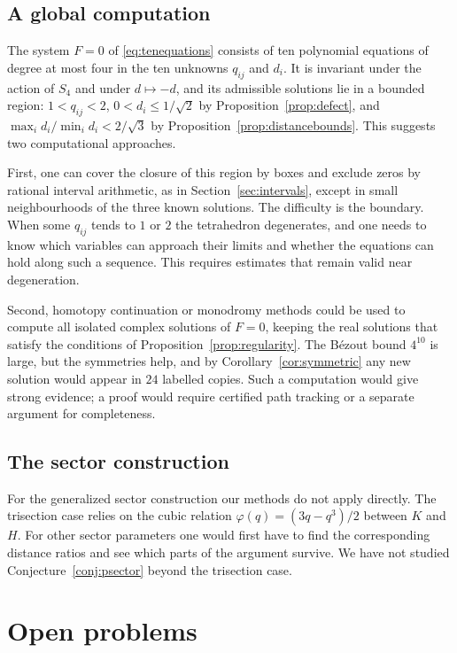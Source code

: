 \documentclass[11pt]{article}
\theoremstyle{definition}
\theoremstyle{remark}
\newcommand{\ph}{\varphi}
\begin{document}
\subsection{A global computation}

The system $F=0$ of \eqref{eq:tenequations} consists of ten polynomial equations of degree at most four in the ten unknowns $q_{ij}$ and $d_i$. It is invariant under the action of $S_4$ and under $d\mapsto-d$, and its admissible solutions lie in a bounded region: $1<q_{ij}<2$, $0<d_i\le1/\sqrt2$ by Proposition~\ref{prop:defect}, and $\max_id_i/\min_id_i<2/\sqrt3$ by Proposition~\ref{prop:distancebounds}. This suggests two computational approaches.

First, one can cover the closure of this region by boxes and exclude zeros by rational interval arithmetic, as in Section~\ref{sec:intervals}, except in small neighbourhoods of the three known solutions. The difficulty is the boundary. When some $q_{ij}$ tends to $1$ or $2$ the tetrahedron degenerates, and one needs to know which variables can approach their limits and whether the equations can hold along such a sequence. This requires estimates that remain valid near degeneration.

Second, homotopy continuation or monodromy methods could be used to compute all isolated complex solutions of $F=0$, keeping the real solutions that satisfy the conditions of Proposition~\ref{prop:regularity}. The B\'ezout bound $4^{10}$ is large, but the symmetries help, and by Corollary~\ref{cor:symmetric} any new solution would appear in $24$ labelled copies. Such a computation would give strong evidence; a proof would require certified path tracking or a separate argument for completeness.

\subsection{The sector construction}

For the generalized sector construction our methods do not apply directly. The trisection case relies on the cubic relation $\ph(q)=(3q-q^3)/2$ between $K$ and $H$. For other sector parameters one would first have to find the corresponding distance ratios and see which parts of the argument survive. We have not studied Conjecture~\ref{conj:psector} beyond the trisection case.

\section{Open problems}
\label{sec:openproblems}
\end{document}

